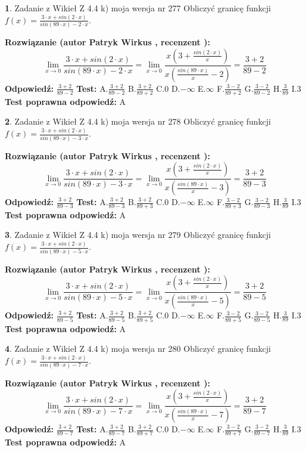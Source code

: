 \documentclass[12pt, a4paper]{article}
\theoremstyle{definition} %
\newtheorem{zad}{}
\newcommand{\zadStart}[1]{\begin{zad}#1\newline}
\newcommand{\zadStop}{\end{zad}}
\newcommand{\rozwStart}[2]{\noindent \textbf{Rozwiązanie (autor #1 , recenzent #2): }\newline}
\newcommand{\rozwStop}{\newline}
\newcommand{\odpStart}{\noindent \textbf{Odpowiedź:}\newline}
\newcommand{\odpStop}{\newline}
\newcommand{\testStart}{\noindent \textbf{Test:}\newline}
\newcommand{\testStop}{\newline}
\newcommand{\kluczStart}{\noindent \textbf{Test poprawna odpowiedź:}\newline}
\newcommand{\kluczStop}{\newline}
\begin{document}
\zadStart{Zadanie z Wikieł Z 4.4 k) moja wersja nr 277}
Obliczyć granicę funkcji $f(x)=\frac{3\cdot x +sin(2\cdot x)}{sin(89\cdot x) -2\cdot x}$.
\zadStop
\rozwStart{Patryk Wirkus}{}
$$\lim\limits_{x\to 0}\frac{3\cdot x +sin(2\cdot x)}{sin(89\cdot x) -2\cdot x}
=\lim\limits_{x\to 0}\frac{x(3+\frac{sin(2\cdot x)}{x})}{x(\frac{sin(89\cdot x)}{x}-2)}
=\frac{3+2}{89-2}$$
\rozwStop
\odpStart
$\frac{3+2}{89-2}$
\odpStop
\testStart
A.$\frac{3+2}{89-2}$
B.$\frac{3+2}{89+2}$
C.$0$
D.$-\infty$
E.$\infty$
F.$\frac{3-2}{89+2}$
G.$\frac{3-2}{89-2}$
H.$\frac{3}{89}$
I.$3$
\testStop
\kluczStart
A
\kluczStop



\zadStart{Zadanie z Wikieł Z 4.4 k) moja wersja nr 278}
Obliczyć granicę funkcji $f(x)=\frac{3\cdot x +sin(2\cdot x)}{sin(89\cdot x) -3\cdot x}$.
\zadStop
\rozwStart{Patryk Wirkus}{}
$$\lim\limits_{x\to 0}\frac{3\cdot x +sin(2\cdot x)}{sin(89\cdot x) -3\cdot x}
=\lim\limits_{x\to 0}\frac{x(3+\frac{sin(2\cdot x)}{x})}{x(\frac{sin(89\cdot x)}{x}-3)}
=\frac{3+2}{89-3}$$
\rozwStop
\odpStart
$\frac{3+2}{89-3}$
\odpStop
\testStart
A.$\frac{3+2}{89-3}$
B.$\frac{3+2}{89+3}$
C.$0$
D.$-\infty$
E.$\infty$
F.$\frac{3-2}{89+3}$
G.$\frac{3-2}{89-3}$
H.$\frac{3}{89}$
I.$3$
\testStop
\kluczStart
A
\kluczStop



\zadStart{Zadanie z Wikieł Z 4.4 k) moja wersja nr 279}
Obliczyć granicę funkcji $f(x)=\frac{3\cdot x +sin(2\cdot x)}{sin(89\cdot x) -5\cdot x}$.
\zadStop
\rozwStart{Patryk Wirkus}{}
$$\lim\limits_{x\to 0}\frac{3\cdot x +sin(2\cdot x)}{sin(89\cdot x) -5\cdot x}
=\lim\limits_{x\to 0}\frac{x(3+\frac{sin(2\cdot x)}{x})}{x(\frac{sin(89\cdot x)}{x}-5)}
=\frac{3+2}{89-5}$$
\rozwStop
\odpStart
$\frac{3+2}{89-5}$
\odpStop
\testStart
A.$\frac{3+2}{89-5}$
B.$\frac{3+2}{89+5}$
C.$0$
D.$-\infty$
E.$\infty$
F.$\frac{3-2}{89+5}$
G.$\frac{3-2}{89-5}$
H.$\frac{3}{89}$
I.$3$
\testStop
\kluczStart
A
\kluczStop



\zadStart{Zadanie z Wikieł Z 4.4 k) moja wersja nr 280}
Obliczyć granicę funkcji $f(x)=\frac{3\cdot x +sin(2\cdot x)}{sin(89\cdot x) -7\cdot x}$.
\zadStop
\rozwStart{Patryk Wirkus}{}
$$\lim\limits_{x\to 0}\frac{3\cdot x +sin(2\cdot x)}{sin(89\cdot x) -7\cdot x}
=\lim\limits_{x\to 0}\frac{x(3+\frac{sin(2\cdot x)}{x})}{x(\frac{sin(89\cdot x)}{x}-7)}
=\frac{3+2}{89-7}$$
\rozwStop
\odpStart
$\frac{3+2}{89-7}$
\odpStop
\testStart
A.$\frac{3+2}{89-7}$
B.$\frac{3+2}{89+7}$
C.$0$
D.$-\infty$
E.$\infty$
F.$\frac{3-2}{89+7}$
G.$\frac{3-2}{89-7}$
H.$\frac{3}{89}$
I.$3$
\testStop
\kluczStart
A
\kluczStop
\end{document}
